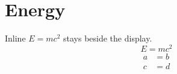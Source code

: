 \documentclass{article}
\begin{document}
\section{Energy}
Inline $E=mc^2$ stays beside the display.
\begin{equation}
E = mc^2
\end{equation}
\begin{align}
a &= b \\
c &= d
\end{align}
\end{document}
